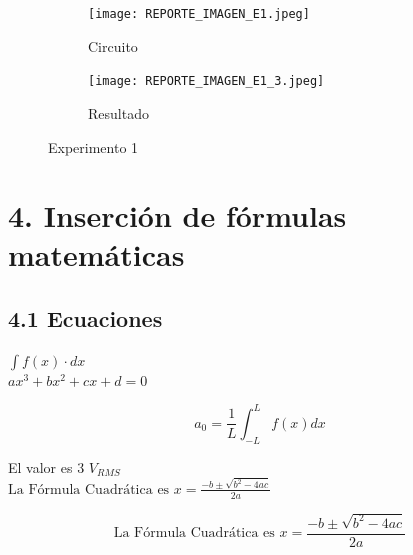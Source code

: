 \documentclass[11pt]{article} %
\begin{document}
    
         \begin{figure} 
             \centering
             \begin{subfigure}{0.45\textwidth}
                  \texttt{[image: REPORTE\_IMAGEN\_E1.jpeg]}
                 \caption{Circuito}
             \end{subfigure}
             \hspace{1cm}
             \begin{subfigure}{0.45\textwidth}
                 \texttt{[image: REPORTE\_IMAGEN\_E1\_3.jpeg]}
                 \caption{Resultado}
             \end{subfigure}
             \caption{Experimento 1}
         \end{figure}
         
         
         
     \section*{4. Inserci\'on de f\'ormulas matem\'aticas}
     
     \subsection*{4.1 Ecuaciones}
     
     $\int f(x) \cdot dx$\\[3mm]
     $	a x^3 + b x^2 + c x + d = 0 $

         \begin{equation} 
             a_{0}=\frac{1}{L}\int_{-L}^{L}f(x)dx 
             \label{FFT_2}
        \end{equation}
        
             El valor es 3 $V_{RMS}$\\
             $\text{La Fórmula Cuadrática es }x = \frac {-b \pm \sqrt {b^2 - 4ac}}{2a}$
         
             \begin{equation}
                 \text{La Fórmula Cuadrática es }x = \frac {-b \pm \sqrt {b^2 - 4ac}}{2a}
             \end{equation}
\end{document}
